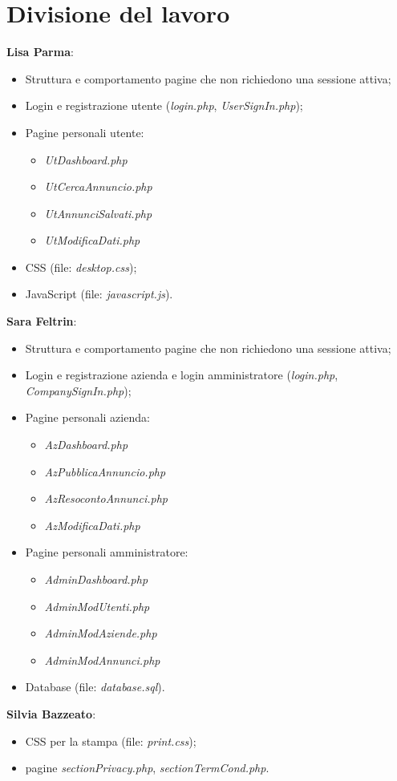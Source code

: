 \section{Divisione del lavoro}

	 \textbf{Lisa Parma}:
	\begin{itemize}
		\item Struttura e comportamento pagine che non richiedono una sessione attiva;
		\item Login e registrazione utente (\emph{login.php}, \emph{UserSignIn.php});
		\item Pagine personali utente:
		\begin{itemize}
			\item \emph{UtDashboard.php}
			\item \emph{UtCercaAnnuncio.php}
			\item \emph{UtAnnunciSalvati.php}
			\item \emph{UtModificaDati.php}
		\end{itemize}
		\item CSS (file: \emph{desktop.css});
		\item JavaScript (file: \emph{javascript.js}).
	\end{itemize}
	 \textbf{Sara Feltrin}:
	\begin{itemize}
		\item Struttura e comportamento pagine che non richiedono una sessione attiva;
		\item Login e registrazione azienda e login amministratore (\emph{login.php}, \emph{CompanySignIn.php});
		\item Pagine personali azienda:
		\begin{itemize}
			\item \emph{AzDashboard.php}
			\item \emph{AzPubblicaAnnuncio.php}
			\item \emph{AzResocontoAnnunci.php}
			\item \emph{AzModificaDati.php}
		\end{itemize}
		\item Pagine personali amministratore:
		\begin{itemize}
			\item \emph{AdminDashboard.php}
			\item \emph{AdminModUtenti.php}
			\item \emph{AdminModAziende.php}
			\item \emph{AdminModAnnunci.php}
		\end{itemize}
	\item Database (file: \emph{database.sql}).
	\end{itemize}
	 \textbf{Silvia Bazzeato}:
	\begin{itemize}
		\item CSS per la stampa (file: \emph{print.css});
		\item pagine \emph{sectionPrivacy.php}, \emph{sectionTermCond.php}.
	\end{itemize}



		


